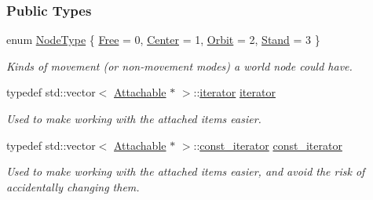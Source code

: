 \subsubsection*{Public Types}
\begin{DoxyCompactItemize}
\item 
enum \hyperlink{classphys_1_1WorldNode_a0b178b06aa411b00c4c2ccd926d9bf5a}{NodeType} \{ \hyperlink{classphys_1_1WorldNode_a0b178b06aa411b00c4c2ccd926d9bf5aaa4f848b95586fc581aa1f749c82a1fb5}{Free} =  0, 
\hyperlink{classphys_1_1WorldNode_a0b178b06aa411b00c4c2ccd926d9bf5aa06be3334346d6ba7913197ee0dd5b8bb}{Center} =  1, 
\hyperlink{classphys_1_1WorldNode_a0b178b06aa411b00c4c2ccd926d9bf5aae9751e5fc4396425fbd7b93171541a22}{Orbit} =  2, 
\hyperlink{classphys_1_1WorldNode_a0b178b06aa411b00c4c2ccd926d9bf5aa2ae400375e79106ae01adf39dd5c1185}{Stand} =  3
 \}
\begin{DoxyCompactList}\small\item\em Kinds of movement (or non-\/movement modes) a world node could have. \item\end{DoxyCompactList}\item 
\hypertarget{classphys_1_1WorldNode_ad7f553f256c4e500e35c36196db26287}{
typedef std::vector$<$ \hyperlink{classphys_1_1Attachable}{Attachable} $\ast$ $>$::\hyperlink{classphys_1_1WorldNode_ad7f553f256c4e500e35c36196db26287}{iterator} \hyperlink{classphys_1_1WorldNode_ad7f553f256c4e500e35c36196db26287}{iterator}}
\label{classphys_1_1WorldNode_ad7f553f256c4e500e35c36196db26287}

\begin{DoxyCompactList}\small\item\em Used to make working with the attached items easier. \item\end{DoxyCompactList}\item 
\hypertarget{classphys_1_1WorldNode_a76139100e549fd31310cd1bed75338ba}{
typedef std::vector$<$ \hyperlink{classphys_1_1Attachable}{Attachable} $\ast$ $>$::\hyperlink{classphys_1_1WorldNode_a76139100e549fd31310cd1bed75338ba}{const\_\-iterator} \hyperlink{classphys_1_1WorldNode_a76139100e549fd31310cd1bed75338ba}{const\_\-iterator}}
\label{classphys_1_1WorldNode_a76139100e549fd31310cd1bed75338ba}

\begin{DoxyCompactList}\small\item\em Used to make working with the attached items easier, and avoid the risk of accidentally changing them. \item\end{DoxyCompactList}\end{DoxyCompactItemize}
